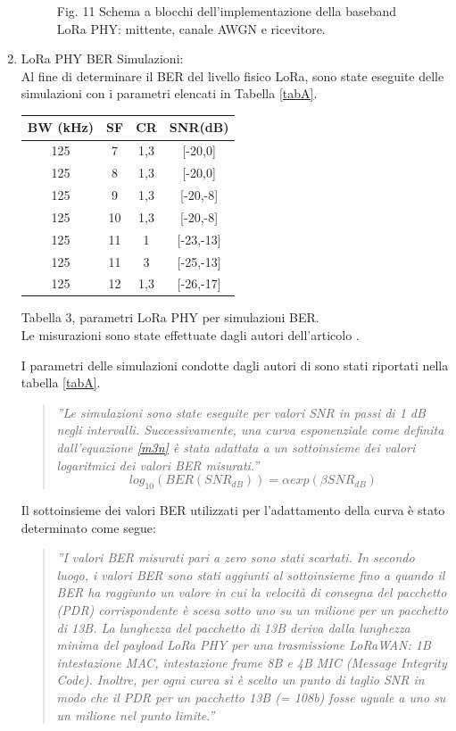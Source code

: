 \documentclass[a4paper]{report} %
\begin{document}
\begin{enumerate}
\begin{figure}
Fig. 11 Schema a blocchi dell'implementazione della baseband LoRa PHY: mittente, canale AWGN e ricevitore.
\end{figure}
\item LoRa PHY BER Simulazioni:  \\
Al fine di determinare il BER del livello fisico LoRa, sono state eseguite delle simulazioni con i parametri elencati in Tabella \ref{tabA}. 
\begin{center}

\begin{tabular}{|c|c|c|c|}
BW (kHz)&SF&CR&SNR(dB)\\ \hline
125&7&1,3&[-20,0]\\ \hline
125&8&1,3&[-20,0]\\ \hline
125&9&1,3&[-20,-8]\\ \hline
125&10&1,3&[-20,-8]\\ \hline
125&11&1&[-23,-13]\\ \hline
125&11&3&[-25,-13]\\ \hline
125&12&1,3&[-26,-17]\\ \hline
\end{tabular} \label{tabA}
Tabella 3, parametri LoRa PHY per simulazioni BER. \\
Le misurazioni sono state effettuate dagli autori dell'articolo \cite{art:rif.49}. \\
\end{center}


I parametri delle simulazioni condotte dagli autori di \cite{art:rif.49} sono stati riportati nella tabella \ref{tabA}.
\begin{quote}
	\textit{''Le simulazioni sono state eseguite per valori SNR in passi di 1 dB negli intervalli. Successivamente, una curva esponenziale come definita dall'equazione \ref{m3n} è stata adattata a un sottoinsieme dei valori logaritmici dei valori BER misurati.''}
	\begin{equation}
	log_{10}(BER (SNR_{dB})) = \alpha exp (\beta SNR_{dB})
	\end{equation}
\end{quote}
Il sottoinsieme dei valori BER utilizzati per l'adattamento della curva è stato determinato come segue:
\begin{quote}
	\textit{''I valori BER misurati pari a zero sono stati scartati. In secondo luogo, i valori BER sono stati aggiunti al sottoinsieme fino a quando il BER ha raggiunto un valore in cui la velocità di consegna del pacchetto (PDR) corrispondente è scesa sotto uno su un milione per un pacchetto di 13B. La lunghezza del pacchetto di 13B deriva dalla lunghezza minima del payload LoRa PHY per una trasmissione LoRaWAN: 1B intestazione MAC, intestazione frame 8B e 4B MIC (Message Integrity Code). Inoltre, per ogni curva si è scelto un punto di taglio SNR in modo che il PDR per un pacchetto 13B (= 108b) fosse uguale a uno su un milione nel punto limite.''}
\end{quote}
\end{enumerate}
\end{document}
